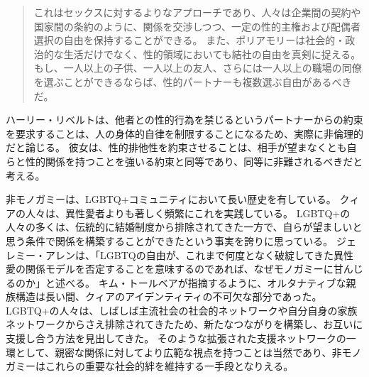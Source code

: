 \documentclass[paper=a4,book,openany]{jlreq}
\begin{document}
\begin{quote}
これはセックスに対するよりなアプローチであり、人々は企業間の契約や国家間の条約のように、関係を交渉しつつ、一定の性的主権および配偶者選択の自由を保持することができる。
また、ポリアモリーは社会的・政治的な生活だけでなく、性的領域においても結社の自由を真剣に捉える。
もし、一人以上の子供、一人以上の友人、さらには一人以上の職場の同僚を選ぶことができるならば、性的パートナーも複数選ぶ自由があるべきだ。
\citep{miller19:_polyam_is_growin}

\end{quote}

ハーリー・リベルトは、他者との性的行為を禁じるというパートナーからの約束を要求することは、人の身体的自律を制限することになるため、実際に非倫理的だと論じる。
彼女は、性的排他性を約束させることは、相手が望まなくとも自らと性的関係を持つことを強いる約束と同等であり、同等に非難されるべきだと考える\citep{liberto17:_prob_sexual_prom}。

非モノガミーは、LGBTQ+コミュニティにおいて長い歴史を有している。
クィアの人々は、異性愛者よりも著しく頻繁にこれを実践している\citep{haupert17:_preval_exper_consen_nonmon_relat}。
LGBTQ+の人々の多くは、伝統的に結婚制度から排除されてきた一方で、自らが望ましいと思う条件で関係を構築することができたという事実を誇りに思っている。
ジェレミー・アレンは、「LGBTQの自由が、これまで何度となく破綻してきた異性愛の関係モデルを否定することを意味するのであれば、なぜモノガミーに甘んじるのか」と述べる\citep{allen20:_his_body_doesn_belon_me}。
キム・トールベアが指摘するように、オルタナティブな親族構造は長い間、クィアのアイデンティティの不可欠な部分であった。
LGBTQ+の人々は、しばしば主流社会の社会的ネットワークや自分自身の家族ネットワークからさえ排除されてきたため、新たなつながりを構築し、お互いに支援し合う方法を見出してきた。
そのような拡張された支援ネットワークの一環として、親密な関係に対してより広範な視点を持つことは当然であり、非モノガミーはこれらの重要な社会的絆を維持する一手段となりえる\citep{podcast18:_episod}。
\end{document}
